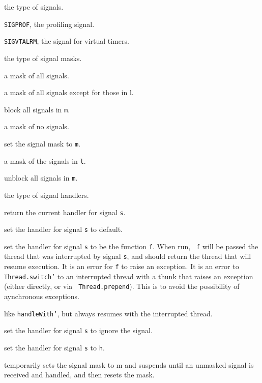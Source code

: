 \begin{description}

 the type of signals.

{\tt SIGPROF}, the profiling signal.

{\tt SIGVTALRM}, the signal for virtual timers.

 the type of signal masks.

 a mask of all signals.

 a mask of all signals except for those in l.

 block all signals in {\tt m}.

 a mask of no signals.

 set the signal mask to {\tt m}.

 a mask of the signals in {\tt l}.

 unblock all signals in {\tt m}.

 the type of signal handlers.

 return the current handler for signal {\tt s}.

 set the handler for signal {\tt s} to default.

set the handler for signal {\tt s} to be the function {\tt f}.  When run, {\tt
f} will be passed the thread that was interrupted by signal {\tt s}, and should
return the thread that will resume execution.  It is an error for {\tt f} to
raise an exception.  It is an error to {\tt Thread.switch'} to an interrupted
thread with a thunk that raises an exception (either directly, or via {\tt
Thread.prepend}).  This is to avoid the possibility of aynchronous exceptions.

 like {\tt handleWith'}, but always resumes with the
interrupted thread.

 set the handler for signal {\tt s} to ignore the signal.

 set the handler for signal {\tt s} to {\tt h}.

temporarily sets the signal mask to m and suspends until an unmasked signal is
received and handled, and then resets the mask.
\end{description}

